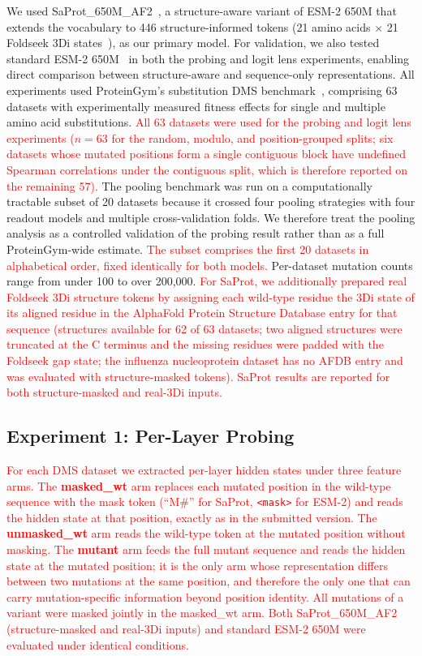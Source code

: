 \documentclass[numbered,webpdf,modern,large]{oup-authoring-template}
\newcommand{\rev}[1]{\textcolor{red}{#1}}
\begin{document}
We used SaProt\_650M\_AF2~\cite{su2024saprot}, a structure-aware variant of ESM-2 650M
that extends the vocabulary to 446 structure-informed tokens (21 amino acids $\times$ 21
Foldseek 3Di states~\cite{vankempen2024foldseek}), as our primary model. For validation,
we also tested standard ESM-2 650M~\cite{lin2023evolutionary} in both the probing and
logit lens experiments, enabling direct comparison between structure-aware and
sequence-only representations. All experiments used ProteinGym's substitution DMS
benchmark~\cite{notin2024proteingym}, comprising 63 datasets with experimentally measured
fitness effects for single and multiple amino acid substitutions. \rev{All 63 datasets
were used for the probing and logit lens experiments ($n = 63$ for the random, modulo, and
position-grouped splits; six datasets whose mutated positions form a single contiguous
block have undefined Spearman correlations under the contiguous split, which is therefore
reported on the remaining 57).} The pooling benchmark was run on a computationally tractable subset of
20 datasets because it crossed four pooling strategies with four readout models and
multiple cross-validation folds. We therefore treat the pooling analysis as a
controlled validation of the probing result rather than as a full ProteinGym-wide
estimate. \rev{The subset comprises the first 20 datasets in alphabetical order,
fixed identically for both models.} Per-dataset mutation counts range from under 100 to over 200,000.
\rev{For SaProt, we additionally prepared real Foldseek 3Di structure tokens by
assigning each wild-type residue the 3Di state of its aligned residue in the
AlphaFold Protein Structure Database entry for that sequence (structures available for
62 of 63 datasets; two aligned structures were truncated at the C terminus and the
missing residues were padded with the Foldseek gap state; the influenza nucleoprotein
dataset has no AFDB entry and was evaluated with structure-masked tokens). SaProt
results are reported for both structure-masked and real-3Di inputs.}

\subsection{Experiment 1: Per-Layer Probing}

\rev{For each DMS dataset we extracted per-layer hidden states under three feature
arms. The \textbf{masked\_wt} arm replaces each mutated position in the wild-type
sequence with the mask token (``M\#'' for SaProt, \texttt{<mask>} for ESM-2) and reads
the hidden state at that position, exactly as in the submitted version. The
\textbf{unmasked\_wt} arm reads the wild-type token at the mutated position without
masking. The \textbf{mutant} arm feeds the full mutant sequence and reads the hidden
state at the mutated position; it is the only arm whose representation differs between
two mutations at the same position, and therefore the only one that can carry
mutation-specific information beyond position identity. All mutations of a variant
were masked jointly in the masked\_wt arm. Both SaProt\_650M\_AF2 (structure-masked
and real-3Di inputs) and standard ESM-2 650M were evaluated under identical conditions.}
\end{document}
